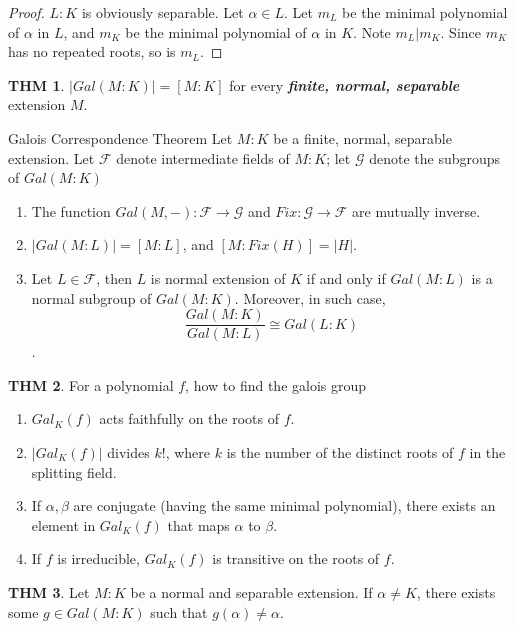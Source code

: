 \documentclass[twocolumn]{article}
\renewcommand{\emph}[1]{\textbf{\textit{#1}}}
\theoremstyle{definition}
\newtheorem{thm}{THM}
\theoremstyle{remark}
\begin{document}
\begin{proof}
	$L:K$ is obviously separable.
	Let $\alpha \in L$. 
	Let $m_L$ be the minimal polynomial of $\alpha$ in $L$, and $m_K$ be the minimal polynomial of $\alpha$ in $K$. 
	Note $m_L | m_K$. Since $m_K$ has no repeated roots, so is $m_L$.
\end{proof}

\begin{thm}
	$|Gal(M:K)| = [M:K]$ for every \emph{finite, normal, separable} extension $M$.
\end{thm}

\begin{fthm}{Galois Correspondence Theorem}{}
	Let $M:K$ be a finite, normal, separable extension.
	Let $\mathscr{F}$ denote intermediate fields of $M:K$;
	let $\mathscr{G}$ denote the subgroups of $Gal(M:K)$

	\begin{enumerate}
		\item The function $Gal(M, -): \mathscr{F} \rightarrow \mathscr{G}$ and $Fix: \mathscr{G} \rightarrow \mathscr{F}$ are mutually inverse.
		\item $|Gal(M:L)| = [M:L]$, and $[M: Fix(H)] = |H|$.
		\item Let $L \in \mathscr{F}$, then $L$ is normal extension of $K$ if and only if $Gal(M:L)$ is a normal subgroup of $Gal(M:K)$.
			Moreover, in such case, 
			$$\frac{Gal(M:K)}{Gal(M:L)} \cong Gal(L:K)$$.
	\end{enumerate}
\end{fthm}

\begin{thm}
	For a polynomial $f$, how to find the galois group
	\begin{enumerate}
		\item $Gal_K(f)$ acts faithfully on the roots of $f$.
		\item $|Gal_K(f)|$ divides $k!$, where $k$ is the number of the distinct roots of $f$ in the splitting field.
		\item If $\alpha, \beta$ are conjugate (having the same minimal polynomial), there exists an element in $Gal_K(f)$ that maps $\alpha$ to $\beta$.
		\item If $f$ is irreducible, $Gal_K(f)$ is transitive on the roots of $f$.
	\end{enumerate}
\end{thm}

\begin{thm}
	Let $M:K$ be a normal and separable extension. 
	If $\alpha \neq K$, there exists some $g \in Gal(M:K)$ such that $g(\alpha) \neq \alpha$.
\end{thm}
\end{document}
